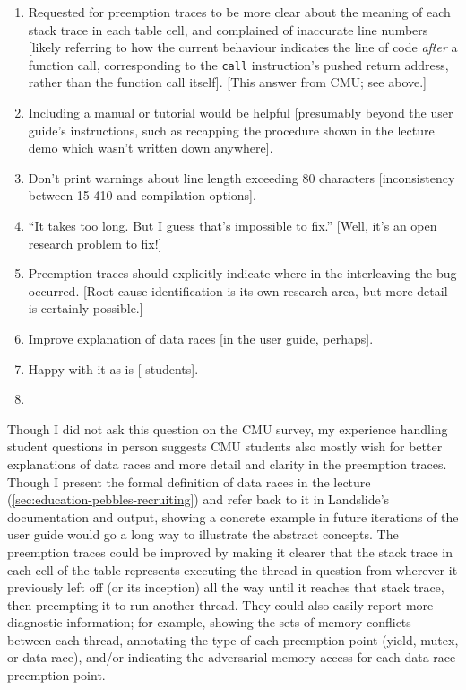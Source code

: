 \begin{enumerate}
	\item Requested for preemption traces to be more clear about the meaning of each stack trace in each table cell,
		and complained of inaccurate line numbers
		[likely referring to how the current behaviour indicates the line of code {\em after} a function call,
		corresponding to the {\tt call} instruction's pushed return address,
		rather than the function call itself]. [This answer from CMU; see above.]
	\item Including a manual or tutorial would be helpful [presumably beyond the user guide's instructions, such as recapping the procedure shown in the lecture demo which wasn't written down anywhere].
	\item Don't print warnings about line length exceeding 80 characters [inconsistency between 15-410 and \psuos compilation options].
	\item ``It takes too long. But I guess that's impossible to fix.'' [Well, it's an open research problem to fix!]
	\item Preemption traces should explicitly indicate where in the interleaving the bug occurred.
		[Root cause identification is its own research area, but more detail is certainly possible.]
	\item Improve explanation of data races [in the user guide, perhaps].
	\item Happy with it as-is [ students].
	\item {}
\end{enumerate}

Though I did not ask this question on the CMU survey,
my experience handling student questions in person
suggests CMU students
also mostly wish for
better explanations of data races and
more detail and clarity in the preemption traces.
Though I present the formal definition of data races in the lecture
(\cref{sec:education-pebbles-recruiting})
and refer back to it in Landslide's documentation and output,
showing a concrete example
in future iterations of the user guide
would go a long way to illustrate the abstract concepts.
The preemption traces could be improved by making it clearer that the stack trace in each cell of the table
represents executing the thread in question from wherever it previously left off (or its inception)
all the way until it reaches that stack trace, then preempting it to run another thread.
They could also easily report more diagnostic information;
for example, showing the sets of memory conflicts between each thread,
annotating the type of each preemption point (yield, mutex, or data race),
and/or indicating the adversarial memory access for each data-race preemption point.

